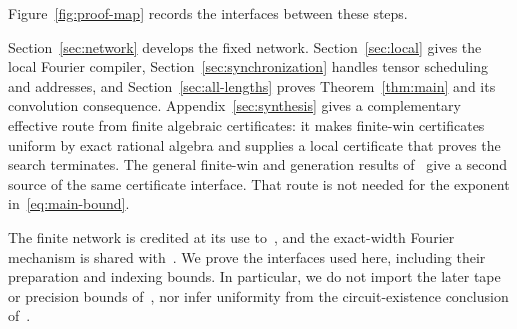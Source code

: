 Figure~\ref{fig:proof-map} records the interfaces between these steps.



Section~\ref{sec:network} develops the fixed network. Section~\ref{sec:local} gives the local Fourier compiler, Section~\ref{sec:synchronization} handles tensor scheduling and addresses, and Section~\ref{sec:all-lengths} proves Theorem~\ref{thm:main} and its convolution consequence. Appendix~\ref{sec:synthesis} gives a complementary effective route from finite algebraic certificates: it makes finite-win certificates uniform by exact rational algebra and supplies a local certificate that proves the search terminates. The general finite-win and generation results of~\cite{exactfourier} give a second source of the same certificate interface. That route is not needed for the exponent in~\eqref{eq:main-bound}.

The finite network is credited at its use to~\cite{motif}, and the exact-width Fourier mechanism is shared with~\cite[Section~3]{exactfourier}. We prove the interfaces used here, including their preparation and indexing bounds. In particular, we do not import the later tape or precision bounds of~\cite{motif}, nor infer uniformity from the circuit-existence conclusion of~\cite{exactfourier}.

\FloatBarrier
